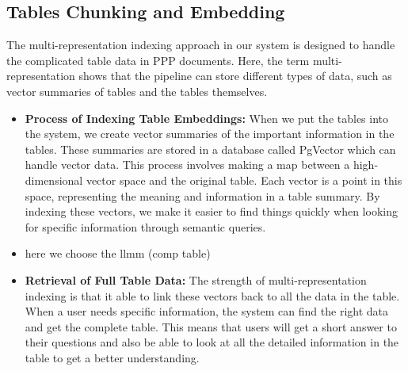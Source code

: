 \subsection{Tables Chunking and Embedding}
The  multi-representation indexing approach  in our system is designed to handle the complicated table data in PPP documents. Here, the term multi-representation shows that the pipeline can store different types of data, such as vector summaries of tables and the tables themselves.
\vskip 0.5cm
\begin{itemize}
    \item \textbf{Process of Indexing Table Embeddings:} When we put the tables into the system, we create vector summaries of the important information in the tables. These summaries are stored in a database called PgVector which can handle vector data. This process involves making a map between a high-dimensional vector space and the original table. Each vector is a point in this space, representing the meaning and information in a table summary. By indexing these vectors, we make it easier to find things quickly when looking for specific information through semantic queries.%
    \item here we choose the llmm (comp table)
    \item \textbf{Retrieval of Full Table Data:} The strength of multi-representation indexing is that it able to link these vectors back to all the data in the table. When a user needs specific information, the system can find the right data and get the complete table. This means that users will get a short answer to their questions and also be able to look at all the detailed information in the table to get a better understanding.%
\end{itemize}

